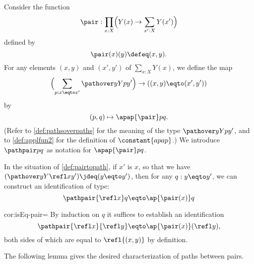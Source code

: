 \begin{definition}
{}
  Consider the function
  \[
    \pair : \prod_{x:X} \Bigl( Y(x) \to \sum _{x':X} Y(x') \Bigr)
  \]
  defined by
  \[
    \pair(x)(y) \defeq (x,y).
  \]
  For any elements $(x,y)$ and $(x',y')$ of $\sum _{x:X} Y(x)$, we define the map
  \[
    \Bigl( \sum_{p:x \eqto x'} \pathover y Y p {y'} \Bigr)
    \to \left ( (x,y) \eqto (x',y') \right )
  \]
  by
  \[
    (p,q) \mapsto \apap {\pair} p q.
  \]
  (Refer to \cref{def:pathsoverpaths} for the meaning of the type $\pathover y Y p {y'}$, and to \cref{def:applfun2} for the definition of $\constant{apap}$.)
  We introduce $\pathpair p q$ as notation for $\apap {\pair} p q$.
\end{definition}

\begin{construction}\label{cor:isEq-pair=}
  In the situation of \cref{def:pairtopath}, if $x'$ is $x$,
  so that we have $( \pathover y Y {\refl x} {y'} ) \jdeq ( y \eqto y' )$,
  then for any $q : y \eqto y'$, we can construct an identification of type:
  \[
    \pathpair {\refl x} q \eqto \ap {\pair (x)} q
  \]
\end{construction}

\begin{implementation}{cor:isEq-pair=}
  By induction on $q$ it suffices to establish an identification
  \[
    \pathpair {\refl x} {\refl y} \eqto \ap {\pair (x)} (\refl y),
  \]
  both sides of which are
  equal to $\refl {(x,y)}$ by definition.
\end{implementation}

The following lemma gives the desired characterization of paths between pairs.

